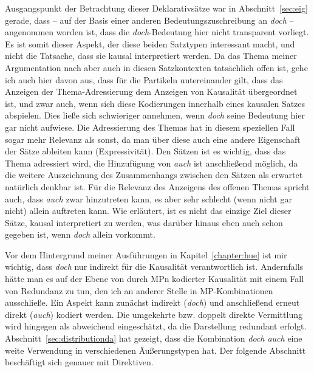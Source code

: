 {Ausgangspunkt der Betrachtung dieser Deklarativsätze war in Abschnitt~\ref{sec:eig} gerade, dass – auf der Basis einer anderen Bedeutungszuschreibung an \textit{doch} – angenommen worden ist, dass die \textit{doch}-Bedeutung hier nicht transparent vorliegt. Es ist somit dieser Aspekt, der diese beiden Satztypen interessant macht, und nicht die Tatsache, dass sie kausal interpretiert werden. Da das Thema meiner Argumentation nach aber auch in diesen Satzkontexten tatsächlich offen ist, gehe ich auch hier davon aus, dass für die Partikeln untereinander gilt, dass das Anzeigen der Thema-Adressierung dem Anzeigen von Kausalität übergeordnet ist, und zwar auch, wenn sich diese Kodierungen innerhalb eines kausalen Satzes abspielen. Dies ließe sich schwieriger annehmen, wenn \textit{doch} seine Bedeutung hier gar nicht aufwiese. Die Adressierung des Themas hat in diesem speziellen Fall sogar mehr Relevanz als sonst, da man über diese auch eine andere Eigenschaft der Sätze ableiten kann (Expressivität). Den Sätzen ist es wichtig, dass das Thema adressiert wird, die Hinzufügung von \textit{auch} ist anschließend möglich, da die weitere Auszeichnung des Zusammenhangs zwischen den Sätzen als erwartet natürlich denkbar ist. Für die Relevanz des Anzeigens des offenen Themas spricht auch, dass \textit{auch} zwar hinzutreten kann, es aber sehr schlecht (wenn nicht gar nicht) allein auftreten kann. Wie erläutert, ist es nicht das einzige Ziel dieser Sätze, kausal interpretiert zu werden, was darüber hinaus eben auch schon gegeben ist, wenn \textit{doch} allein vorkommt. 

Vor dem Hintergrund meiner Ausführungen in Kapitel~\ref{chapter:hue} ist mir wichtig, dass \textit{doch} nur indirekt für die Kausalität verantwortlich ist. Andernfalls hätte man es auf der Ebene von durch MPn kodierter Kausalität mit einem Fall von Redundanz zu tun, den ich an anderer Stelle in MP-Kombinationen ausschließe. Ein Aspekt kann zunächst indirekt (\textit{doch}) und anschließend erneut direkt (\textit{auch}) kodiert werden. Die umgekehrte bzw. doppelt direkte Vermittlung wird hingegen als abwei\-chend eingeschätzt, da die Darstellung redundant erfolgt.\\

\noindent
Abschnitt~\ref{sec:distributionda} hat gezeigt, dass die Kombination \textit{doch auch} eine weite Verwendung in verschiedenen Äußerungstypen hat. Der folgende Abschnitt beschäftigt sich genauer mit Direktiven.
\setcounter{equation}{0}
}
